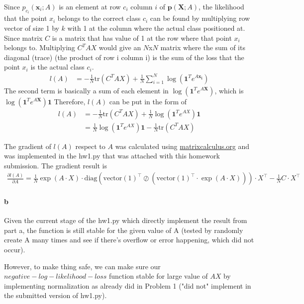 \documentclass{scrartcl}
\begin{document}
Since $p_{c_{i}}(\mathbf{x}_i;A)$ is an element at row $c_{i}$ column $i$ of $\mathbf{p}(\mathbf{X};A)$, the likelihood that the point $x_i$ belongs to the correct class $c_i$ can be found by multiplying row vector of size 1 by $k$ with 1 at the column where the actual class positioned at. 
Since matrix $C$ is a matrix that has value of 1 at the row where that point $x_i$ belongs to. Multiplying $C^{T}AX$ would give an $N$x$N$ matrix where the sum of its diagonal (trace) (the product of row i column i) is the sum of the loss that the point $x_i$ is the actual class $c_i$. 
\begin{align}
l(A)
&=-\frac{1}{N}\textrm{tr}(C^{T}AX) + \frac{1}{N} \sum_{i=1}^{N}\log(\mathbf{1}^Te^{A\mathbf{x_i}})
\end{align}
\newpage
The second term is basically a sum of each element in $\log(\mathbf{1}^Te^{A\mathbf{X}})$, which is $\log(\mathbf{1}^Te^{A\mathbf{X}})\mathbf{1}$
Therefore, $l(A)$ can be put in the form of
\begin{align}
l(A)
&=-\frac{1}{N}\textrm{tr}(C^{T}AX) + \frac{1}{N} \log(\mathbf{1}^Te^{AX})\mathbf{1}\\
&=\frac{1}{N} \log(\mathbf{1}^Te^{AX})\mathbf{1} -\frac{1}{N}\textrm{tr}(C^{T}AX)
\end{align}

The gradient of $l(A)$ respect to $A$ was calculated using
\href{https://www.matrixcalculus.org/}{matrixcalculus.org} and was implemented in the hw1.py that was attached with this homework submission.
The gradient result is
\begin{align}
\frac{\partial l(A)}{\partial A}  = \frac{1}{N}\exp(A\cdot X)\cdot \mathrm{diag}(\mathrm{vector}(1)^\top\oslash (\mathrm{vector}(1)^\top \cdot \exp(A\cdot X)))\cdot X^\top  - \frac{1}{N}C\cdot X^\top 
\end{align}

\paragraph{b}
Given the current stage of the hw1.py which directly implement the result from part a, the function is still stable for the given value of A (tested by randomly create A many times and see if there's overflow or error happening, which did not occur).

However, to make thing safe, we can make sure our $negative-log-likelihood-loss$ function stable for large value of $AX$ by implementing normalization as already did in Problem 1 ("did not" implement in the submitted version of hw1.py).
\end{document}
